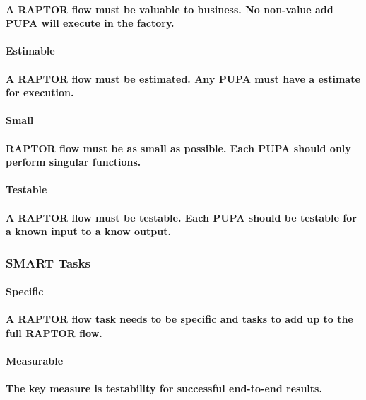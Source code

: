 \documentclass{acm_proc_article-sp}
\begin{document}
\paragraph{A RAPTOR flow must be valuable to business. No non-value add PUPA will execute in the factory.}
\paragraph{\textbf{Estimable}}
\paragraph{A RAPTOR flow must be estimated. Any PUPA must have a estimate for execution.}
\paragraph{\textbf{Small}}
\paragraph{RAPTOR flow must be as small as possible. Each PUPA should only perform singular functions.}
\paragraph{\textbf{Testable}}
\paragraph{A RAPTOR flow must be testable. Each PUPA should be testable for a known input to a know output.}
\subsubsection{SMART Tasks}
\paragraph{\textbf{Specific}}
\paragraph{A RAPTOR flow task needs to be specific and tasks to add up to the full RAPTOR flow.}
\paragraph{\textbf{Measurable}}
\paragraph{The key measure is testability for successful end-to-end results.}
\end{document}
